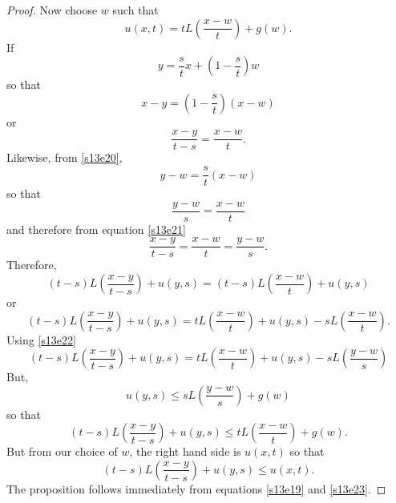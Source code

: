 \documentclass{article}
\theoremstyle{plain}
\numberwithin{thm}{section}
\theoremstyle{plain}
\numberwithin{prop}{section}
\theoremstyle{definition}
\numberwithin{defn}{section}
\theoremstyle{remark}
\numberwithin{equation}{section}
\begin{document}
\begin{proof}
\noindent Now choose $w$ such that
\[
u(x, t) = tL\left(\frac{x - w}{t}\right) + g(w).
\]
If 
\begin{equation}\label{s13e20}
y = \frac{s}{t}x + \left(1 - \frac{s}{t}\right)w
\end{equation}
so that
\[
x - y =  \left(1 - \frac{s}{t}\right)(x - w)
\]
or
\begin{equation}\label{s13e21}
\frac{x - y}{t - s} = \frac{x - w}{t}.
\end{equation}
Likewise, from \eqref{s13e20},
\[
y - w = \frac{s}{t}(x - w)
\]
so that
\[
\frac{y - w}{s} = \frac{x - w}{t}
\]
and therefore from equation \eqref{s13e21}
\begin{equation}\label{s13e22}
\frac{x - y}{t - s} = \frac{x - w}{t} = \frac{y - w}{s}.
\end{equation}
Therefore,
\[
(t - s)L\left(\frac{x - y}{t - s}\right) + u(y, s) = 
(t - s)L\left(\frac{x - w}{t}\right) + u(y, s)
\]
or
\[
(t - s)L\left(\frac{x - y}{t - s}\right) + u(y, s) = tL\left(\frac{x - w}{t}\right) + u(y, s)
- sL\left(\frac{x - w}{t}\right).
\]
Using \eqref{s13e22}
\[
(t - s)L\left(\frac{x - y}{t - s}\right) + u(y, s) = tL\left(\frac{x - w}{t}\right) + u(y, s)
- sL\left(\frac{y - w}{s}\right)
\]
But,
\[
u(y, s) \le sL\left(\frac{y - w}{s}\right) + g(w)
\]
so that
\[
(t - s)L\left(\frac{x - y}{t - s}\right) + u(y, s) \le tL\left(\frac{x - w}{t}\right) + g(w).
\]
But from our choice of $w$, the right hand side is $u(x, t)$ so that
\begin{equation}\label{s13e23}
(t - s)L\left(\frac{x - y}{t - s}\right) + u(y, s) \le u(x, t).
\end{equation}
The proposition follows immediately from equations \eqref{s13e19} and \eqref{s13e23}.
\end{proof}
\end{document}
